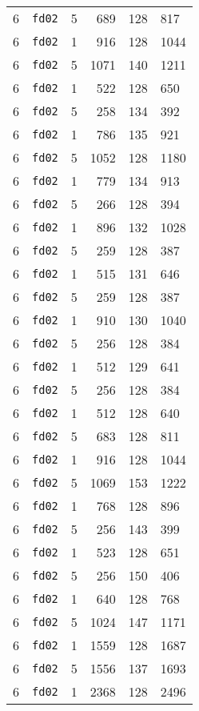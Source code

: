 \documentclass{article}
\begin{document}
\begin{table}[h!]
\begin{tabular}{llrrrl}
    6 & \texttt{fd02} & 5 & 689 & 128 & 817 \\
    6 & \texttt{fd02} & 1 & 916 & 128 & 1044 \\
    6 & \texttt{fd02} & 5 & 1071 & 140 & 1211 \\
    6 & \texttt{fd02} & 1 & 522 & 128 & 650 \\
    6 & \texttt{fd02} & 5 & 258 & 134 & 392 \\
    6 & \texttt{fd02} & 1 & 786 & 135 & 921 \\
    6 & \texttt{fd02} & 5 & 1052 & 128 & 1180 \\
    6 & \texttt{fd02} & 1 & 779 & 134 & 913 \\
    6 & \texttt{fd02} & 5 & 266 & 128 & 394 \\
    6 & \texttt{fd02} & 1 & 896 & 132 & 1028 \\
    6 & \texttt{fd02} & 5 & 259 & 128 & 387 \\
    6 & \texttt{fd02} & 1 & 515 & 131 & 646 \\
    6 & \texttt{fd02} & 5 & 259 & 128 & 387 \\
    6 & \texttt{fd02} & 1 & 910 & 130 & 1040 \\
    6 & \texttt{fd02} & 5 & 256 & 128 & 384 \\
    6 & \texttt{fd02} & 1 & 512 & 129 & 641 \\
    6 & \texttt{fd02} & 5 & 256 & 128 & 384 \\
    6 & \texttt{fd02} & 1 & 512 & 128 & 640 \\
    6 & \texttt{fd02} & 5 & 683 & 128 & 811 \\
    6 & \texttt{fd02} & 1 & 916 & 128 & 1044 \\
    6 & \texttt{fd02} & 5 & 1069 & 153 & 1222 \\
    6 & \texttt{fd02} & 1 & 768 & 128 & 896 \\
    6 & \texttt{fd02} & 5 & 256 & 143 & 399 \\
    6 & \texttt{fd02} & 1 & 523 & 128 & 651 \\
    6 & \texttt{fd02} & 5 & 256 & 150 & 406 \\
    6 & \texttt{fd02} & 1 & 640 & 128 & 768 \\
    6 & \texttt{fd02} & 5 & 1024 & 147 & 1171 \\
    6 & \texttt{fd02} & 1 & 1559 & 128 & 1687 \\
    6 & \texttt{fd02} & 5 & 1556 & 137 & 1693 \\
    6 & \texttt{fd02} & 1 & 2368 & 128 & 2496 \\

\end{tabular}
\end{table}
\end{document}

